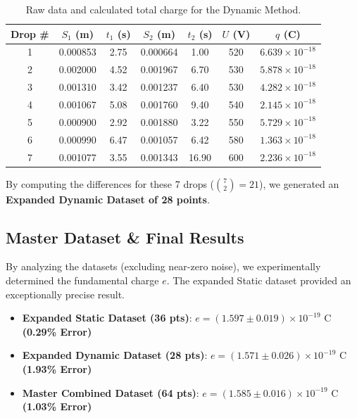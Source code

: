 \documentclass[a4paper,11pt]{article}
\begin{document}
\begin{table}[H]
\centering
\caption{Raw data and calculated total charge for the Dynamic Method.}
\label{tab:dynamic}

\begin{tabular}{c S[table-format=1.6] S[table-format=1.2] S[table-format=1.6] S[table-format=1.2] S[table-format=3.0] c}
\toprule
{Drop \#} & {$S_1$ (m)} & {$t_1$ (s)} & {$S_2$ (m)} & {$t_2$ (s)} & {$U$ (V)} & {$q$ (C)} \\
 & 0.000853 & 2.75 & 0.000664 & 1.00 & 520 & $6.639 \times 10^{-18}$ \\
2 & 0.002000 & 4.52 & 0.001967 & 6.70 & 530 & $5.878 \times 10^{-18}$ \\
3 & 0.001310 & 3.42 & 0.001237 & 6.40 & 530 & $4.282 \times 10^{-18}$ \\
4 & 0.001067 & 5.08 & 0.001760 & 9.40 & 540 & $2.145 \times 10^{-18}$ \\
5 & 0.000900 & 2.92 & 0.001880 & 3.22 & 550 & $5.729 \times 10^{-18}$ \\
6 & 0.000990 & 6.47 & 0.001057 & 6.42 & 580 & $1.363 \times 10^{-18}$ \\
7 & 0.001077 & 3.55 & 0.001343 & 16.90 & 600 & $2.236 \times 10^{-18}$ \\
\bottomrule
\end{tabular}

\end{table}

By computing the differences for these 7 drops ($\binom{7}{2} = 21$), we generated an \textbf{Expanded Dynamic Dataset of 28 points}.

\subsection{Master Dataset \& Final Results}
By analyzing the datasets (excluding near-zero noise), we experimentally determined the fundamental charge $e$. The expanded Static dataset provided an exceptionally precise result.

\begin{itemize}
    \item \textbf{Expanded Static Dataset (36 pts)}: $e = (1.597 \pm 0.019) \times 10^{-19}\text{ C}$ \textbf{(0.29\% Error)}
    \item \textbf{Expanded Dynamic Dataset (28 pts)}: $e = (1.571 \pm 0.026) \times 10^{-19}\text{ C}$ \textbf{(1.93\% Error)}
    \item \textbf{Master Combined Dataset (64 pts)}: $e = (1.585 \pm 0.016) \times 10^{-19}\text{ C}$ \textbf{(1.03\% Error)}
\end{itemize}
\end{document}
